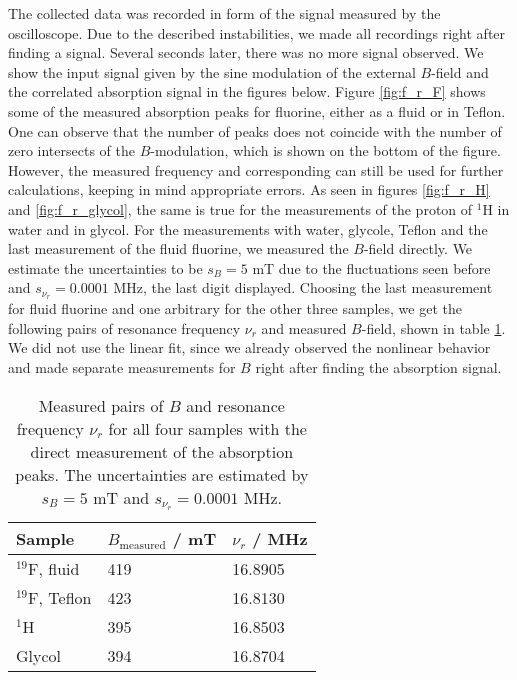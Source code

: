 The collected data was recorded in form of the signal measured by the oscilloscope. 
Due to the described instabilities, we made all recordings right after finding a signal. 
Several seconds later, there was no more signal observed.
We show the input signal given by the sine modulation of the external $B$-field and 
the correlated absorption signal in the figures below. Figure \ref{fig:f_r_F} shows 
some of the measured absorption peaks for fluorine, either as a fluid or in Teflon. 
One can observe that the number of peaks does not coincide with the number of zero 
intersects of the $B$-modulation, which is shown on the bottom of the figure. 
However, the measured frequency and corresponding can still be used for further calculations, 
keeping in mind appropriate errors. 
As seen in figures \ref{fig:f_r_H} and \ref{fig:f_r_glycol}, the same is true for 
the measurements of the proton of $^1$H in water and in glycol. For the measurements with 
water, glycole, Teflon and the last measurement of the fluid fluorine, we measured the $B$-field 
directly. We estimate the uncertainties to be $s_B = 5$ mT due to the fluctuations seen before and 
$s_{\nu_r} = 0.0001$ MHz, the last digit displayed. 
Choosing the last measurement for fluid fluorine and one arbitrary for the other three samples, we get the 
following pairs of resonance frequency $\nu_r$ and measured 
$B$-field, shown in table \ref{tab:f_r}. 
We did not use the linear fit, since we already observed the nonlinear behavior and 
made separate measurements for $B$ right after finding the absorption signal. 
\renewcommand{\arraystretch}{1.5}
\begin{table}[htdp]
    \centering
    \begin{tabular}{|p{6.18cm}|p{3.82cm}|p{3.82cm}|}
        \hline
        \rowcolor{LightCyan}
        Sample & $B_\mathrm{measured}$ / mT & $\nu_r$ / MHz\\ \hline
        $^{19}$F, fluid & 419 & 16.8905\\
        $^{19}$F, Teflon & 423 & 16.8130\\
        $^1$H   & 395 & 16.8503 \\
        Glycol  & 394 & 16.8704 \\
        \hline
    \end{tabular}
    \caption{
        Measured pairs of $B$ and resonance frequency $\nu_r$ for all four samples 
        with the direct measurement 
        of the absorption peaks. The uncertainties are estimated by $s_B = 5$ mT 
        and $s_{\nu_r} = 0.0001$ MHz. 
        }
    \label{tab:f_r}
\end{table}

\FloatBarrier

